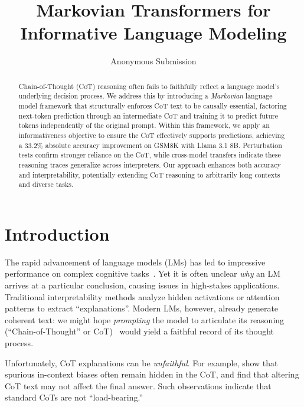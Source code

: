\documentclass[letterpaper]{article} %
\title{Markovian Transformers for Informative Language Modeling}
\author{
    Anonymous Submission
}
\begin{document}
\maketitle

\begin{abstract}
Chain-of-Thought (CoT) reasoning often fails to faithfully reflect a language model's underlying decision process. We address this by introducing a \emph{Markovian} language model framework that structurally enforces CoT text to be causally essential, factoring next-token prediction through an intermediate CoT and training it to predict future tokens independently of the original prompt. Within this framework, we apply an informativeness objective to ensure the CoT effectively supports predictions, achieving a 33.2\% absolute accuracy improvement on GSM8K with Llama 3.1 8B. Perturbation tests confirm stronger reliance on the CoT, while cross-model transfers indicate these reasoning traces generalize across interpreters. Our approach enhances both accuracy and interpretability, potentially extending CoT reasoning to arbitrarily long contexts and diverse tasks.
\end{abstract}


\section{Introduction}
\label{sec:intro}
The rapid advancement of language models (LMs) has led to impressive performance on complex cognitive tasks~\citep{NEURIPS2020_1457c0d6}. Yet it is often unclear \emph{why} an LM arrives at a particular conclusion, causing issues in high-stakes applications. Traditional interpretability methods analyze hidden activations or attention patterns to extract ``explanations''. Modern LMs, however, already generate coherent text: we might hope \emph{prompting} the model to articulate its reasoning (``Chain-of-Thought'' or CoT)~\citep{wei2022chain} would yield a faithful record of its thought process. 

Unfortunately, CoT explanations can be \emph{unfaithful}. For example, \citet{turpin2023language} show that spurious in-context biases often remain hidden in the CoT, and \citet{lanham2023measuring} find that altering CoT text may not affect the final answer. Such observations indicate that standard CoTs are not ``load-bearing.''
\end{document}
